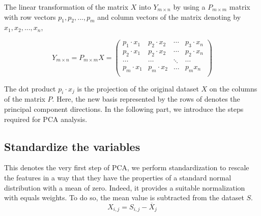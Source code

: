 \documentclass[conference]{IEEEtran}
\begin{document}
The linear transformation of the matrix $X$ into ${{Y}_{m\times n}}$ by using a ${{P}_{m\times m}}$ matrix with row vectors ${{p}_{1}},{{p}_{2}},...,{{p}_{m}}$ and column vectors of the matrix  denoting by ${{x}_{1}},{{x}_{2}},...,{{x}_{n}}$,

\begin{equation}
{{Y}_{m\times n}}={{P}_{m\times m}}X=\left( \begin{matrix}
   {{p}_{1}}\cdot {{x}_{1}} & {{p}_{2}}\cdot {{x}_{2}} & \cdots  & {{p}_{3}}\cdot {{x}_{n}}  \\
   {{p}_{2}}\cdot {{x}_{1}} & {{p}_{2}}\cdot {{x}_{2}} & \cdots  & {{p}_{2}}\cdot {{x}_{n}}  \\
   \cdots  & \cdots  & \ddots  & \cdots   \\
   {{p}_{m}}\cdot {{x}_{1}} & {{p}_{m}}\cdot {{x}_{2}} & \ldots  & {{p}_{m}}{{x}_{n}}  \\
\end{matrix} \right)
\end{equation}

The dot product ${{p}_{i}}\cdot {{x}_{j}}$ is the projection of the original dataset $X$ on the columns of the matrix $P$. Here, the new basis represented by the rows of denotes the principal component directions. In the following part, we introduce the steps required for PCA analysis.

\subsection{Standardize the variables}
This denotes the very first step of PCA, we perform standardization to rescale the features in a way that they have the properties of a standard normal distribution with a mean of zero. Indeed, it provides a suitable normalization with equals weights. To do so, the mean value is subtracted from the dataset $S$.
\begin{equation}
{{X}_{i,j}}={{S}_{i,j}}-{{\overline{X}}_{j}}
\end{equation}
\end{document}
